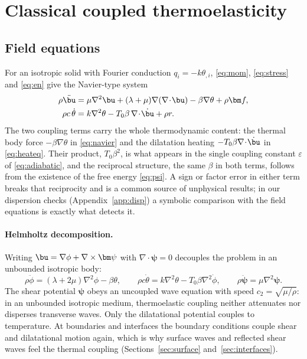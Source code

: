 \section{Classical coupled thermoelasticity}\label{sec:classical}
\subsection{Field equations}
For an isotropic solid with Fourier conduction $q_i=-k\theta_{,i}$, \eqref{eq:mom}, \eqref{eq:stress} and \eqref{eq:en} give the Navier-type system
\begin{align}
\rho\ddot{\bu}&=\mu\nabla^2\bu+(\lambda+\mu)\nabla(\nabla\!\cdot\!\bu)-\beta\nabla\theta+\rho\bm f,\label{eq:navier}\\
\rho c\,\dot\theta&=k\nabla^2\theta-T_0\beta\,\nabla\!\cdot\!\dot{\bu}+\rho r.\label{eq:heateq}
\end{align}
The two coupling terms carry the whole thermodynamic content: the thermal body force $-\beta\nabla\theta$ in \eqref{eq:navier} and the dilatation heating $-T_0\beta\nabla\!\cdot\!\dot{\bu}$ in \eqref{eq:heateq}. Their product, $T_0\beta^2$, is what appears in the single coupling constant $\varepsilon$ of \eqref{eq:adiabatic}, and the reciprocal structure, the same $\beta$ in both terms, follows from the existence of the free energy \eqref{eq:psi}. A sign or factor error in either term breaks that reciprocity and is a common source of unphysical results; in our dispersion checks (Appendix~\ref{app:disp}) a symbolic comparison with the field equations is exactly what detects it.

\paragraph{Helmholtz decomposition.} Writing $\bu=\nabla\phi+\nabla\times\bm\psi$ with $\nabla\!\cdot\!\bm\psi=0$ decouples the problem in an unbounded isotropic body:
\begin{equation}
\rho\ddot\phi=(\lambda+2\mu)\nabla^2\phi-\beta\theta,\qquad
\rho c\dot\theta=k\nabla^2\theta-T_0\beta\nabla^2\dot\phi,\qquad
\rho\ddot{\bm\psi}=\mu\nabla^2\bm\psi.\label{eq:helm}
\end{equation}
The shear potential $\bm\psi$ obeys an uncoupled wave equation with speed $c_2=\sqrt{\mu/\rho}$: in an unbounded isotropic medium, thermoelastic coupling neither attenuates nor disperses transverse waves. Only the dilatational potential couples to temperature. At boundaries and interfaces the boundary conditions couple shear and dilatational motion again, which is why surface waves and reflected shear waves feel the thermal coupling (Sections~\ref{sec:surface} and~\ref{sec:interfaces}).

